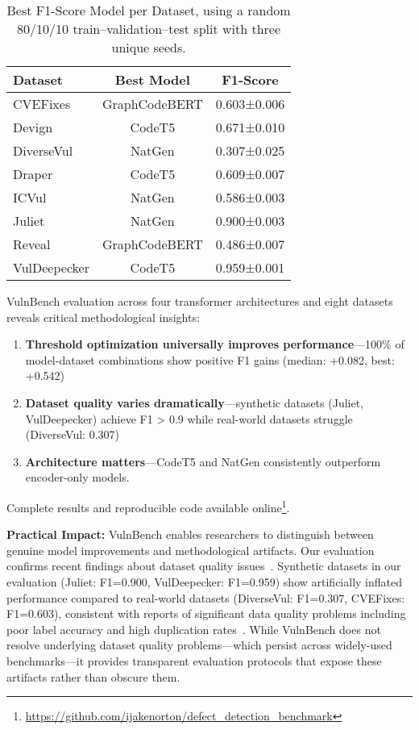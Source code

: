 \documentclass[letterpaper]{article}
\begin{document}
\begin{table}[ht]
	\centering
	\caption{Best F1-Score Model per Dataset, using a random 80/10/10 train–validation–test split with three unique seeds.}
	\label{tab:results}
	\begin{tabular}{lcc}
		\toprule
		Dataset      & Best Model    & F1-Score    \\
		\midrule
		CVEFixes     & GraphCodeBERT & 0.603±0.006 \\
		Devign       & CodeT5        & 0.671±0.010 \\
		DiverseVul   & NatGen        & 0.307±0.025 \\
		Draper       & CodeT5        & 0.609±0.007 \\
		ICVul        & NatGen        & 0.586±0.003 \\
		Juliet       & NatGen        & 0.900±0.003 \\
		Reveal       & GraphCodeBERT & 0.486±0.007 \\
		VulDeepecker & CodeT5        & 0.959±0.001 \\
		\bottomrule
	\end{tabular}
\end{table}

VulnBench evaluation across four transformer architectures and eight datasets reveals critical methodological insights:
\begin{enumerate}
	\item \textbf{Threshold optimization universally improves performance}---100\% of model-dataset combinations show positive F1 gains (median: +0.082, best: +0.542)
	\item \textbf{Dataset quality varies dramatically}---synthetic datasets (Juliet, VulDeepecker) achieve F1 > 0.9 while real-world datasets struggle (DiverseVul: 0.307)
	\item \textbf{Architecture matters}---CodeT5 and NatGen consistently outperform encoder-only models. 
\end{enumerate}

Complete results and reproducible code available online\footnote{\url{https://github.com/ijakenorton/defect_detection_benchmark}}.

\textbf{Practical Impact:} VulnBench enables researchers to distinguish between genuine model improvements and methodological artifacts. Our evaluation confirms recent findings about dataset quality issues~\citep{ding2025vulnerability,chen2023diversevul}. Synthetic datasets in our evaluation (Juliet: F1=0.900, VulDeepecker: F1=0.959) show artificially inflated performance compared to real-world datasets (DiverseVul: F1=0.307, CVEFixes: F1=0.603), consistent with reports of significant data quality problems including poor label accuracy and high duplication rates~\cite{ding2025vulnerability}. While VulnBench does not resolve underlying dataset quality problems---which persist across widely-used benchmarks---it provides transparent evaluation protocols that expose these artifacts rather than obscure them.
\end{document}
